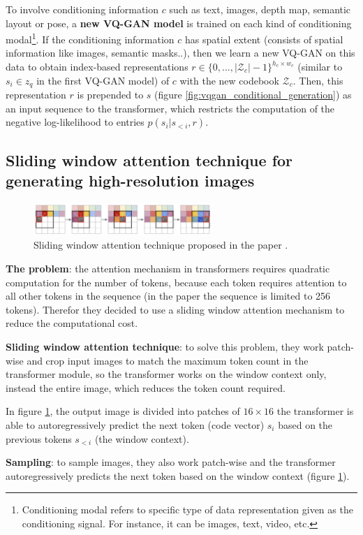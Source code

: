 To involve conditioning information $c$ such as text, images, depth map, semantic layout or pose, a \textbf{new VQ-GAN model} is trained on each kind of conditioning modal\footnote{Conditioning modal refers to specific type of data representation given as the conditioning signal. For instance, it can be images, text, video, etc.}. If the conditioning information $c$ has spatial extent (consists of spatial information like images, semantic masks..), then we learn a new VQ-GAN on this data to obtain index-based representations $r \in \{0,...,|\mathcal{Z}_c| - 1\}^{h_c \times w_c}$ (similar to $s_i \in z_q$ in the first VQ-GAN model) of $c$ with the new codebook $\mathcal{Z}_c$. Then, this representation $r$ is prepended to $s$ (figure \ref{fig:vqgan_conditional_generation}) as an input sequence to the transformer, which restricts the computation of the negative log-likelihood to entries $p(s_i | s_{<i}, r)$.








\subsection{Sliding window attention technique for generating high-resolution images}

\begin{figure}[h]
    \centering
    \includegraphics[width=0.6\textwidth]{images/vqgan_sliding_attention.png}
    \caption{Sliding window attention technique proposed in the paper \cite{vqgan}.}
    \label{fig:vqgan_sliding_window}
\end{figure}

\textbf{The problem}: the attention mechanism in transformers requires quadratic computation for the number of tokens, because each token requires attention to all other tokens in the sequence (in the paper the sequence is limited to 256 tokens). Therefor they decided to use a sliding window attention mechanism to reduce the computational cost.

\textbf{Sliding window attention technique}: to solve this problem, they work patch-wise and crop input images to match the maximum token count in the transformer module, so the transformer works on the window context only, instead the entire image, which reduces the token count required.

In figure \ref{fig:vqgan_sliding_window}, the output image is divided into patches of $16\times 16$  the transformer is able to autoregressively predict the next token (code vector) $s_i$ based on the previous tokens $s_{<i}$ (the window context).


\textbf{Sampling}: to sample images, they also work patch-wise and the transformer autoregressively predicts the next token based on the window context (figure \ref{fig:vqgan_sliding_window}).
